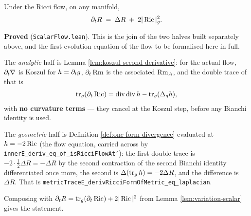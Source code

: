 \begin{theorem}
  \label{thm:evolution-scal}
  \leanok
  Under the Ricci flow, on any manifold,
  \[
    \partial_t R \;=\; \Delta R \;+\; 2|\operatorname{Ric}|^2_g .
  \]

  \textbf{Proved} (\texttt{ScalarFlow.lean}). This is the join of the two
  halves built separately above, and the first evolution equation of the flow
  to be formalised here in full.

  The \emph{analytic} half is Lemma \ref{lem:koszul-second-derivative}: for the
  actual flow, $\partial_t\nabla$ is Koszul for $h = \partial_tg$, $\partial_t
  \operatorname{Rm}$ is the associated $\operatorname{Rm}_A$, and the double trace of that is
  \[
    \operatorname{tr}_g(\partial_t \operatorname{Ric})
      = \operatorname{div}\operatorname{div} h
        - \operatorname{tr}_g(\Delta_g h),
  \]
  with \textbf{no curvature terms} --- they cancel at the Koszul step, before
  any Bianchi identity is used.

  The \emph{geometric} half is Definition \ref{def:one-form-divergence}
  evaluated at $h = -2\operatorname{Ric}$ (the flow equation, carried across by
  \texttt{innerE\_deriv\_eq\_of\_isRicciFlowAt'}): the first double trace is
  $-2\cdot\tfrac12\Delta R = -\Delta R$ by the second contraction of the second
  Bianchi identity differentiated once more, the second is
  $\Delta(\operatorname{tr}_g h) = -2\Delta R$, and the difference is $\Delta
  R$. That is
  \texttt{metricTraceE\_derivRicciFormOfMetric\_eq\_laplacian}.

  Composing with $\partial_t R = \operatorname{tr}_g(\partial_t\operatorname{Ric}) +
  2|\operatorname{Ric}|^2$ from Lemma \ref{lem:variation-scalar} gives the statement.
\end{theorem}

